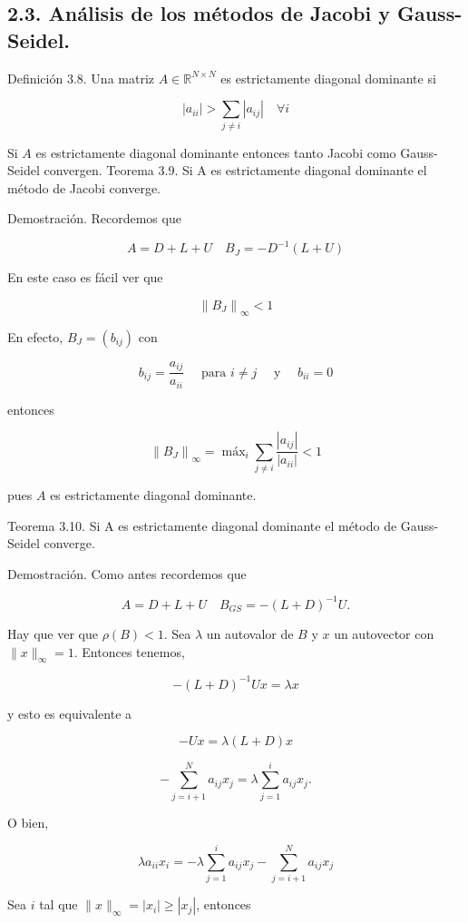 \documentclass[10pt]{book}
\begin{document}
\subsection*{2.3. Análisis de los métodos de Jacobi y Gauss-Seidel.}
Definición 3.8. Una matriz $A \in \mathbb{R}^{N \times N}$ es estrictamente diagonal dominante si

$$
\left|a_{i i}\right|>\sum_{j \neq i}\left|a_{i j}\right| \quad \forall i
$$

Si $A$ es estrictamente diagonal dominante entonces tanto Jacobi como Gauss-Seidel convergen. Teorema 3.9. Si A es estrictamente diagonal dominante el método de Jacobi converge.

Demostración. Recordemos que

$$
A=D+L+U \quad B_{J}=-D^{-1}(L+U)
$$

En este caso es fácil ver que

$$
\left\|B_{J}\right\|_{\infty}<1
$$

En efecto, $B_{J}=\left(b_{i j}\right)$ con

$$
b_{i j}=\frac{a_{i j}}{a_{i i}} \quad \text { para } i \neq j \quad \text { y } \quad b_{i i}=0
$$

entonces

$$
\left\|B_{J}\right\|_{\infty}=\operatorname{máx}_{i} \sum_{j \neq i} \frac{\left|a_{i j}\right|}{\left|a_{i i}\right|}<1
$$

pues $A$ es estrictamente diagonal dominante.

Teorema 3.10. Si A es estrictamente diagonal dominante el método de Gauss-Seidel converge.

Demostración. Como antes recordemos que

$$
A=D+L+U \quad B_{G S}=-(L+D)^{-1} U .
$$

Hay que ver que $\rho(B)<1$. Sea $\lambda$ un autovalor de $B$ y $x$ un autovector con $\|x\|_{\infty}=1$. Entonces tenemos,

$$
-(L+D)^{-1} U x=\lambda x
$$

y esto es equivalente a

$$
-U x=\lambda(L+D) x
$$

$$
-\sum_{j=i+1}^{N} a_{i j} x_{j}=\lambda \sum_{j=1}^{i} a_{i j} x_{j} .
$$

O bien,

$$
\lambda a_{i i} x_{i}=-\lambda \sum_{j=1}^{i} a_{i j} x_{j}-\sum_{j=i+1}^{N} a_{i j} x_{j}
$$

Sea $i$ tal que $\|x\|_{\infty}=\left|x_{i}\right| \geq\left|x_{j}\right|$, entonces
\end{document}
